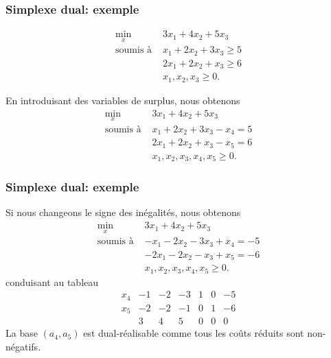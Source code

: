 \documentclass[usepdftitle=false]{beamer}
\begin{document}
\begin{frame}
	\frametitle{Simplexe dual: exemple}
	
	\begin{align*}
		\min_x \ & 3x_1 + 4x_2 + 5x_3 \\
		\mbox{soumis à } & x_1 + 2x_2 + 3x_3 \geq 5 \\
		& 2x_1 + 2x_2 + x_3 \geq 6 \\
		& x_1, x_2, x_3 \geq 0.
	\end{align*}
	
	\mbox{}
	
	En introduisant des variables de surplus, nous obtenons
	\begin{align*}
		\min_x \ & 3x_1 + 4x_2 + 5x_3 \\
		\mbox{soumis à } & x_1 + 2x_2 + 3x_3 - x_4 = 5 \\
		& 2x_1 + 2x_2 + x_3 -x_5 = 6 \\
		& x_1, x_2, x_3, x_4, x_5 \geq 0.
	\end{align*}
	
\end{frame}

\begin{frame}
	\frametitle{Simplexe dual: exemple}
	
	Si nous changeons le signe des inégalités, nous obtenons
	\begin{align*}
		\min_x \ & 3x_1 + 4x_2 + 5x_3 \\
		\mbox{soumis à } & -x_1 - 2x_2 - 3x_3 + x_4 = -5 \\
		& -2x_1 - 2x_2 - x_3 + x_5 = -6 \\
		& x_1, x_2, x_3, x_4, x_5 \geq 0.
	\end{align*}
	conduisant au tableau
	\[
	\begin{matrix}
		x_4 & -1 & -2 & -3 & 1 & 0 & -5 \\
		x_5 & -2 & -2 & -1 & 0 & 1 & -6 \\
		& 3 & 4 & 5 & 0 & 0 & 0
	\end{matrix}
	\]
	La base $(a_4, a_5)$ est dual-réalisable comme tous les coûts réduits sont non-négatifs.
	
\end{frame}
\end{document}
